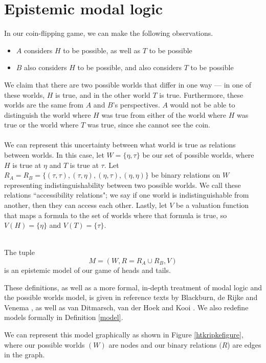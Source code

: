 \section{Epistemic modal logic}\label{survey_epistemic_modal_logic}
In our coin-flipping game, we can make the following observations.
\begin{itemize}
	\item $A$ considers $H$ to be possible, as well as $T$ to be possible
	\item $B$ also considers $H$ to be possible, and also considers $T$ to be possible
\end{itemize}
We claim that there are two possible worlds that differ in one way ---
in one of these worlds, $H$ is true, and in the other world $T$ is true.
Furthermore, these worlds are the same from $A$ and $B$'s perspectives.
$A$ would not be able to distinguish the world where $H$ was true from either of
the world where $H$ was true or the world where $T$ was true, since she cannot
see the coin.\\
\\
We can represent this uncertainty between what world is true as relations
between worlds.
In this case, let $W = \{ \eta, \tau\}$ be our set of possible worlds, where $H$ is true
at $\eta$ and $T$ is true at $\tau$.
Let $R_A = R_B = \{(\tau,\tau), (\tau,\eta), (\eta, \tau), (\eta,\eta)\}$ be
binary relations on $W$ representing indistinguishability between two possible
worlds.
We call these relations ``accessibility relations"; we say if one world is
indistinguishable from another, then they can access each other.
Lastly, let $V$ be a valuation function that maps a formula to the set of worlds
where that formula is true, so $V(H) = \{\eta\}$ and $V(T) = \{\tau\}$.\\
\\

\begin{defn}
	The tuple
	\[
		M = (W, R = R_A \cup R_B, V)
	\]
	is an epistemic model of our game of heads and tails.
\end{defn}

These definitions, as well as a more formal, in-depth treatment of modal logic and
the possible worlds model, is given in reference texts by Blackburn, de Rijke and Venema \cite{blackburn2002modal},
as well as van Ditmarsch, van der Hoek and Kooi \cite{hoek2008dynamic}.
We also redefine models formally in Definition \ref{model}.

We can represent this model graphically as shown in Figure \ref{htkripkefigure},
where our possible worlds $(W)$ are nodes and our binary relations $(R$) are edges in the
graph.

